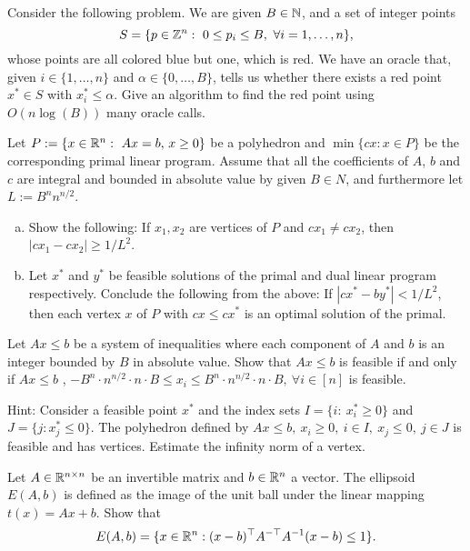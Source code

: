 \documentclass[11pt]{article}
\institute{\'Ecole Polytechnique F\'ed\'erale de Lausanne}
\begin{document}
\makeheader


\problemstar
Consider the following problem. We are given $B\in \mathbb{N}$, and a set of integer points 
$$S=\{p\in \mathbb{Z}^n: \ 0\leq p_i\leq B, \ \forall i=1,\dots,n\},$$ 
whose points are all colored blue but one, which is red. We have an oracle that, given $i \in \{1,\dots,n\}$ and $\alpha \in \{0,\dots,B\}$, tells us whether there exists a red point $x^* \in S$ with $x^*_i \leq \alpha$. 
Give an algorithm to find the red point using $O(n\log(B))$ many oracle calls.



\problem
Let $P := \{x \in \mathbb{R}^n: \ Ax = b, \, x \geq 0 \}$ be a polyhedron and $\min\{cx: x \in P \}$ be the corresponding primal linear program. Assume that all the coefficients of $A$, $b$ and $c$ are integral and bounded in absolute value by given $B \in N$, and furthermore let $L := B^n n^{n/2}$.
\begin{enumerate}[(a)]
	\item Show the following: If $x_1, x_2$ are vertices of $P$ and $cx_1 \neq cx_2$, then $|cx_1 - cx_2| \geq  1/L^2$.
	\item Let $x^*$ and $y^*$ be feasible solutions of the primal and dual linear program respectively. Conclude the following from the above: If $| cx^* - by^*| < 1/L^2$, then each vertex $x$ of $P$ with $cx \leq cx^*$ is an optimal solution of the primal. 
\end{enumerate}

\problem
Let $Ax \leq b$ be a system of inequalities where each component of $A$ and $b$ is an integer bounded by $B$ in absolute value. Show that $Ax \leq b$ is feasible if and only if $Ax \leq b$ , $-B^{n} \cdot n^{n/2} \cdot n \cdot B \leq x_i \leq B^{n} \cdot n^{n/2} \cdot n \cdot B, \ \forall i \in [n]$ is feasible.

 \smallskip
 
Hint: Consider a feasible point $x^*$ and the index sets $I = \{i : \ x^*_i \geq 0\}$ and $J = \{j : x^*_j \leq 0\}$. The polyhedron defined by $Ax \leq b, \ x_i \geq 0, \ i \in I, \ x_j \leq 0, \ j \in J$ is feasible and has vertices. Estimate the infinity norm of a vertex. 

\problem
Let $A \in \mathbb{R}^{n \times n}$ be an invertible matrix and $b \in \mathbb{R}^{n}$ a vector. The ellipsoid $E(A,b)$ is defined as the image of the unit ball under the linear mapping $t(x) = Ax+b$. Show that
$$E(A,b) = \{ x \in \mathbb{R}^n: (x-b)^\top A^{-\top} A^{-1} (x-b) \leq 1 \}.$$
	
\end{document}
